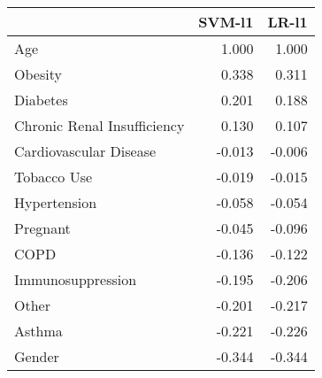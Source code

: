 \begin{tabular}{lrr}
\toprule
{} &  SVM-l1 &  LR-l1 \\
\midrule
Age                         &   1.000 &  1.000 \\
Obesity                     &   0.338 &  0.311 \\
Diabetes                    &   0.201 &  0.188 \\
Chronic Renal Insufficiency &   0.130 &  0.107 \\
Cardiovascular Disease      &  -0.013 & -0.006 \\
Tobacco Use                 &  -0.019 & -0.015 \\
Hypertension                &  -0.058 & -0.054 \\
Pregnant                    &  -0.045 & -0.096 \\
COPD                        &  -0.136 & -0.122 \\
Immunosuppression           &  -0.195 & -0.206 \\
Other                       &  -0.201 & -0.217 \\
Asthma                      &  -0.221 & -0.226 \\
Gender                      &  -0.344 & -0.344 \\
\bottomrule
\end{tabular}
